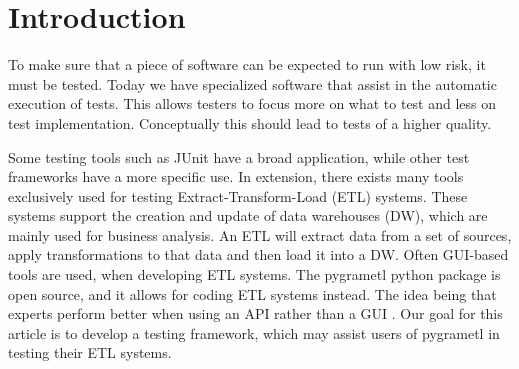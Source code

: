 \section*{Introduction} %

To make sure that a piece of software can be expected to run with low risk, it must be tested. Today we have specialized software that assist in the automatic execution of tests. This allows testers to focus more on what to test and less on test implementation. Conceptually this should lead to tests of a higher quality.

Some testing tools such as JUnit have a  broad application, while other test frameworks have a more specific use. In extension, there exists many tools exclusively used for testing  Extract-Transform-Load (ETL) systems. These systems support the creation and update of data warehouses (DW), which are mainly used for business analysis. An ETL will extract data from a set of sources, apply transformations to that data and then load it into a DW. Often GUI-based tools are used, when developing ETL systems. The pygrametl python package is open source, and it allows for coding ETL systems instead. The idea being that experts perform better when using an API rather than a GUI \cite{thomsen2009pygrametl}. Our goal for this article is to develop a testing framework, which may assist users of pygrametl in testing their ETL systems. 

